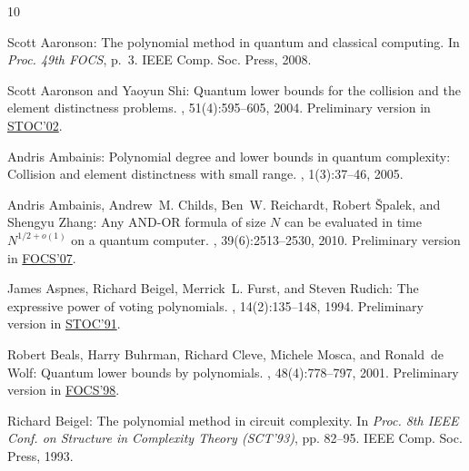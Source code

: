 \tocrefpdfbookmark
\begin{thebibliography}{10}

{\sc Scott Aaronson}: The polynomial method in quantum and classical computing.
\newblock In {\em Proc. 49th FOCS}, p.~3. IEEE Comp. Soc. Press, 2008.

{\sc Scott Aaronson and Yaoyun Shi}: Quantum lower bounds for the collision and
  the element distinctness problems.
, 51(4):595--605, 2004.
\newblock Preliminary version in
  \href{http://dx.doi.org/10.1145/509907.509999}{STOC'02}.
\newblock [\epfmtdoi{10.1145/1008731.1008735}]

{\sc Andris Ambainis}: Polynomial degree and lower bounds in quantum
  complexity: {C}ollision and element distinctness with small range.
, 1(3):37--46, 2005.

{\sc Andris Ambainis, Andrew~M. Childs, Ben~W. Reichardt, Robert {\v S}palek,
  and Shengyu Zhang}: Any {AND-OR} formula of size {$N$} can be evaluated in
  time {$N^{1/2+o(1)}$} on a quantum computer.
, 39(6):2513--2530, 2010.
\newblock Preliminary version in
  \href{http://dx.doi.org/10.1109/FOCS.2007.57}{FOCS'07}.
\newblock [\epfmtdoi{10.1137/080712167}]

{\sc James Aspnes, Richard Beigel, Merrick~L. Furst, and Steven Rudich}: The
  expressive power of voting polynomials.
, 14(2):135--148, 1994.
\newblock Preliminary version in
  \href{http://dx.doi.org/10.1145/103418.103461}{STOC'91}.
\newblock [\epfmtdoi{10.1007/BF01215346}]

{\sc Robert Beals, Harry Buhrman, Richard Cleve, Michele Mosca, and Ronald~de
  Wolf}: Quantum lower bounds by polynomials.
, 48(4):778--797, 2001.
\newblock Preliminary version in
  \href{http://dx.doi.org/10.1109/SFCS.1998.743485}{FOCS'98}.
\newblock [\epfmtdoi{10.1145/502090.502097}]

{\sc Richard Beigel}: The polynomial method in circuit complexity.
\newblock In {\em Proc. 8th IEEE Conf. on Structure in Complexity Theory
  (SCT'93)}, pp. 82--95. IEEE Comp. Soc. Press, 1993.


\end{thebibliography}
